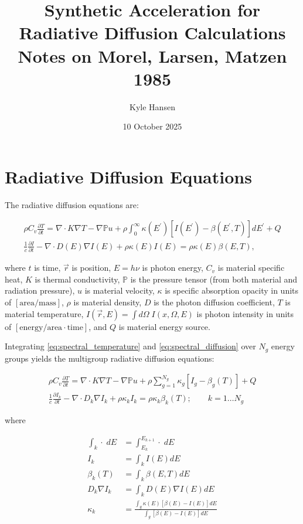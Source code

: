 \documentclass{template}
\title{Synthetic Acceleration for Radiative Diffusion Calculations\\
  \large Notes on Morel, Larsen, Matzen 1985 \cite{morel1985synthetic}}
\author{Kyle Hansen}
\date{10 October 2025}
\begin{document}
\maketitle

\section{Radiative Diffusion Equations}

The radiative diffusion equations are:

\begin{gather}
\label{eq:spectral_temperature}
\rho C_v \frac{\partial T}{\partial t} = \nabla \cdot K \nabla T - \nabla {\mathbb{P}u} + \rho \int_0^\infty \kappa(E^\prime)\left[ I(E^\prime) - \beta(E^\prime, T) \right] dE^\prime + Q\\
\label{eq:spectral_diffusion}
\frac{1}{c}\frac{\partial I}{\partial t} - \nabla \cdot D(E) \nabla I(E) + \rho \kappa(E)I(E) = \rho\kappa(E)\beta(E, T), 
\end{gather}

where $t$ is time, $\vec{r}$ is position, $E = h\nu$ is photon energy, $C_v$ is material specific heat, $K$ is thermal conductivity, $\mathbb{P}$ is the pressure tensor (from both material and radiation pressure), $u$ is material velocity, $\kappa$ is specific absorption opacity in units of $[\text{area}/\text{mass}]$, $\rho$ is material density, $D$ is the photon diffusion coefficient, $T$ is material temperature, $I(\vec{r}, E) = \int d\Omega \; I(x, \Omega, E)$ is photon intensity in units of $[\text{energy}/\text{area}\cdot\text{time}]$, and $Q$ is material energy source.

Integrating \autoref{eq:spectral_temperature} and \autoref{eq:spectral_diffusion} over $N_g$ energy groups yields the multigroup radiative diffusion equations:

\begin{gather}
  \label{eq:multigroup_temperature}
  \rho C_v \frac{\partial T}{\partial t} = \nabla \cdot K \nabla T - \nabla {\mathbb{P}u} + \rho \sum_{g=1}^{N_g} \kappa_g \left[ I_g - \beta_g(T) \right] + Q\\
  \label{eq:multigroup_diffusion}
  \frac{1}{c}\frac{\partial I_k}{\partial t} - \nabla \cdot D_k \nabla I_k + \rho \kappa_k I_k = \rho\kappa_k \beta_k(T); \qquad k=1\dots N_g
\end{gather}

where

\begin{subequations}
  \begin{align}
    \int_k \cdot \; dE &= \int_{E_k}^{E_{k+1}}\cdot\; dE\\
    I_k &= \int_k I(E) dE\\
    \beta_k(T) &= \int_k \beta(E, T) dE\\
    D_k \nabla I_k &= \int_k D(E) \nabla I(E) dE\\
    \kappa_k &= \frac{\int_g \kappa(E) \left[ \beta(E) - I(E) \right] dE}{\int_g \left[ \beta(E) - I(E) \right] dE}
  \end{align}
\end{subequations}
\end{document}
